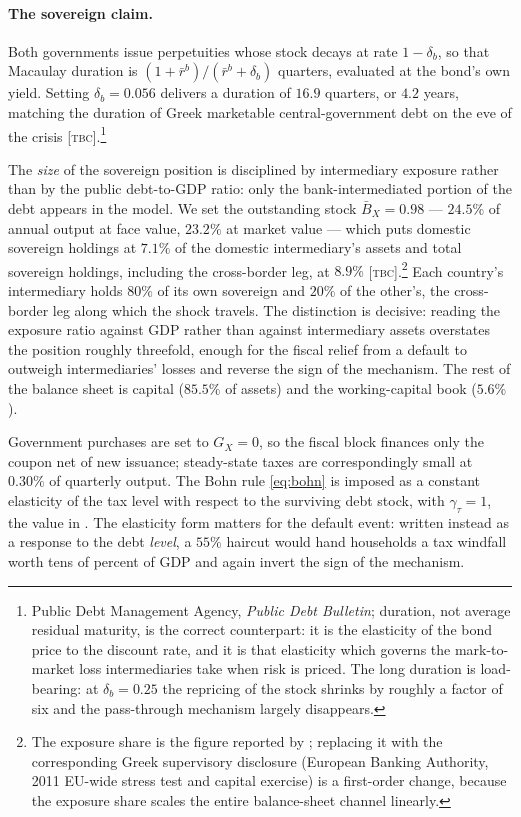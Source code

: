 \paragraph{The sovereign claim.}
Both governments issue \citet{Hatchondo2009} perpetuities whose stock decays at
rate $1-\delta_b$, so that Macaulay duration is
$(1+\bar r^{b})/(\bar r^{b}+\delta_b)$ quarters, evaluated at the bond's own
yield. Setting $\delta_b=0.056$ delivers a duration of $16.9$ quarters, or $4.2$
years, matching the duration of Greek marketable central-government debt on the
eve of the crisis [\textsc{tbc}].\footnote{Public Debt Management Agency,
\emph{Public Debt Bulletin}; duration, not average residual maturity, is the
correct counterpart: it is the elasticity of the bond price to the discount rate,
and it is that elasticity which governs the mark-to-market loss intermediaries
take when risk is priced. The long duration is load-bearing: at $\delta_b=0.25$
the repricing of the stock shrinks by roughly a factor of six and the
pass-through mechanism largely disappears.}

The \emph{size} of the sovereign position is disciplined by intermediary exposure
rather than by the public debt-to-GDP ratio: only the bank-intermediated portion
of the debt appears in the model. We set the
outstanding stock $\bar B_X=0.98$ --- $24.5\%$ of annual output at face value,
$23.2\%$ at market value --- which puts domestic sovereign holdings at $7.1\%$ of
the domestic intermediary's assets and total sovereign holdings, including the
cross-border leg, at $8.9\%$ [\textsc{tbc}].\footnote{The exposure share is the
figure reported by \citet{bocola2016pass}; replacing it with the corresponding
Greek supervisory disclosure (European Banking Authority, 2011 EU-wide stress test
and capital exercise) is a first-order change, because the exposure share scales
the entire balance-sheet channel linearly.} Each country's intermediary holds
$80\%$ of its own sovereign and $20\%$ of the other's, the cross-border leg along
which the shock travels. The distinction is decisive: reading the exposure ratio
against GDP rather than against intermediary assets overstates the position
roughly threefold, enough for the fiscal relief from a default to outweigh
intermediaries' losses and reverse the sign of the mechanism. The rest of the
balance sheet is capital ($85.5\%$ of assets) and the working-capital book
($5.6\%$).

Government purchases are set to $G_X=0$, so the fiscal block finances only the
coupon net of new issuance; steady-state taxes are correspondingly small at
$0.30\%$ of quarterly output. The Bohn rule \eqref{eq:bohn} is imposed as a
constant elasticity of the tax level with respect to the surviving debt stock,
with $\gamma_\tau=1$, the value in \citet{bocola2016pass}. The elasticity form
matters for the default event: written instead as a response to the debt
\emph{level}, a $55\%$ haircut would hand households a tax windfall worth tens of
percent of GDP and again invert the sign of the mechanism.

